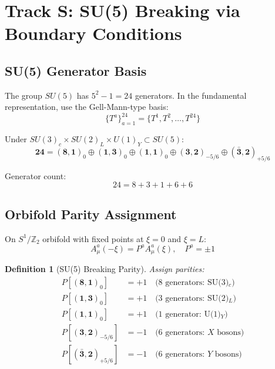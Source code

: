 \documentclass[11pt,a4paper]{article}
\newtheorem{definition}[theorem]{Definition}
\begin{document}
\section{Track S: SU(5) Breaking via Boundary Conditions}
\label{sec:track-s}

\subsection{SU(5) Generator Basis}

The group $SU(5)$ has $5^2 - 1 = 24$ generators. In the fundamental representation,
use the Gell-Mann-type basis:
\begin{equation}
  \{T^a\}_{a=1}^{24} = \{T^1, T^2, \ldots, T^{24}\}
  \label{eq:su5-generators}
\end{equation}

Under $SU(3)_c \times SU(2)_L \times U(1)_Y \subset SU(5)$:
\begin{equation}
  \mathbf{24} = (\mathbf{8}, \mathbf{1})_0 \oplus (\mathbf{1}, \mathbf{3})_0
    \oplus (\mathbf{1}, \mathbf{1})_0 \oplus (\mathbf{3}, \mathbf{2})_{-5/6}
    \oplus (\mathbf{\bar{3}}, \mathbf{2})_{+5/6}
  \label{eq:24-decomp}
\end{equation}

Generator count:
\begin{equation}
  24 = 8 + 3 + 1 + 6 + 6
  \label{eq:gen-count-24}
\end{equation}

\subsection{Orbifold Parity Assignment}

On $S^1/\mathbb{Z}_2$ orbifold with fixed points at $\xi = 0$ and $\xi = L$:
\begin{equation}
  A_\mu^a(-\xi) = P^a A_\mu^a(\xi), \quad P^a = \pm 1
  \label{eq:orbifold-parity}
\end{equation}

\begin{definition}[SU(5) Breaking Parity]
\label{def:su5-parity}
Assign parities:
\begin{align}
  P[(\mathbf{8}, \mathbf{1})_0] &= +1 \quad \text{(8 generators: SU(3)$_c$)}
  \label{eq:p-su3} \\
  P[(\mathbf{1}, \mathbf{3})_0] &= +1 \quad \text{(3 generators: SU(2)$_L$)}
  \label{eq:p-su2} \\
  P[(\mathbf{1}, \mathbf{1})_0] &= +1 \quad \text{(1 generator: U(1)$_Y$)}
  \label{eq:p-u1} \\
  P[(\mathbf{3}, \mathbf{2})_{-5/6}] &= -1 \quad \text{(6 generators: $X$ bosons)}
  \label{eq:p-x} \\
  P[(\mathbf{\bar{3}}, \mathbf{2})_{+5/6}] &= -1 \quad \text{(6 generators: $Y$ bosons)}
  \label{eq:p-y}
\end{align}
\end{definition}
\end{document}
